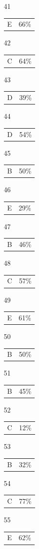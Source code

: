 \documentclass[12pt]{article}
\begin{document}
\begin{multicols}{5}
\begin{enumerate}
\item[41] \begin{tabular}{cc} E & 66\%\end{tabular}
\item[42] \begin{tabular}{cc} C & 64\%\end{tabular}
\item[43] \begin{tabular}{cc} D & 39\%\end{tabular}
\item[44] \begin{tabular}{cc} D & 54\%\end{tabular}
\item[45] \begin{tabular}{cc} B & 50\%\end{tabular}
\item[]
\item[46] \begin{tabular}{cc} E & 29\%\end{tabular}
\item[47] \begin{tabular}{cc} B & 46\%\end{tabular}
\item[48] \begin{tabular}{cc} C & 57\%\end{tabular}
\item[49] \begin{tabular}{cc} E & 61\%\end{tabular}
\item[50] \begin{tabular}{cc} B & 50\%\end{tabular}
\item[]
\item[51] \begin{tabular}{cc} B & 45\%\end{tabular}
\item[52] \begin{tabular}{cc} C & 12\%\end{tabular}
\item[53] \begin{tabular}{cc} B & 32\%\end{tabular}
\item[54] \begin{tabular}{cc} C & 77\%\end{tabular}
\item[55] \begin{tabular}{cc} E & 62\%\end{tabular}

\end{enumerate}
\end{multicols}
\end{document}
